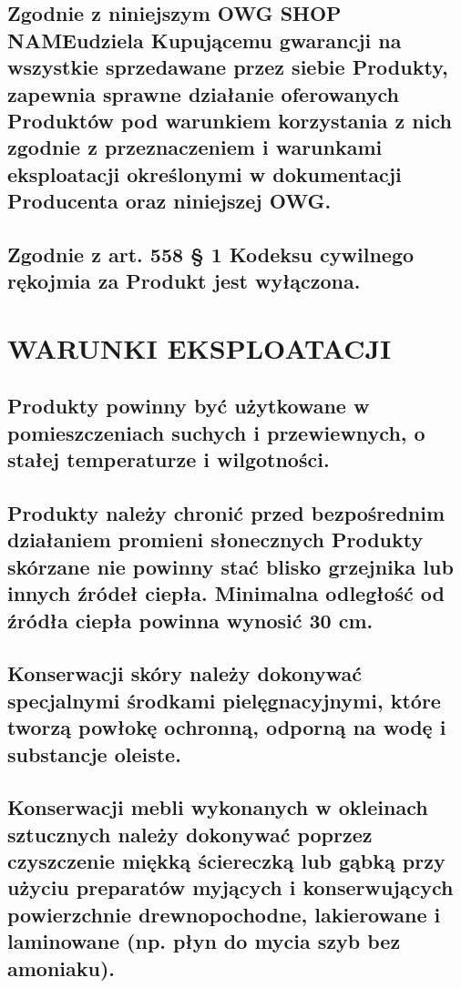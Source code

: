 \documentclass[10pt,a4paper]{article}
\newcommand{\shopname}{SHOP NAME}
\begin{document}
\subsection{Zgodnie z niniejszym OWG \shopname udziela Kupującemu gwarancji na wszystkie sprzedawane przez siebie Produkty, zapewnia
sprawne działanie oferowanych Produktów pod warunkiem korzystania z nich zgodnie z przeznaczeniem i warunkami eksploatacji
określonymi w dokumentacji Producenta oraz niniejszej OWG.}

\subsection{Zgodnie z art. 558 § 1 Kodeksu cywilnego rękojmia za Produkt jest wyłączona.}

\section{WARUNKI EKSPLOATACJI} 

\subsection{Produkty powinny być użytkowane w pomieszczeniach suchych i przewiewnych, o stałej temperaturze i wilgotności.}

\subsection{Produkty należy chronić przed bezpośrednim działaniem promieni słonecznych
Produkty skórzane nie powinny stać blisko grzejnika lub innych źródeł ciepła. Minimalna odległość od źródła ciepła powinna wynosić 30 cm.}

\subsection{Konserwacji skóry należy dokonywać specjalnymi środkami pielęgnacyjnymi, które tworzą powłokę ochronną, odporną na wodę i substancje oleiste.}

\subsection{Konserwacji mebli wykonanych w okleinach sztucznych należy dokonywać poprzez czyszczenie miękką ściereczką lub gąbką przy użyciu preparatów myjących i konserwujących powierzchnie drewnopochodne, lakierowane i laminowane (np. płyn do mycia szyb bez amoniaku).}
\end{document}
